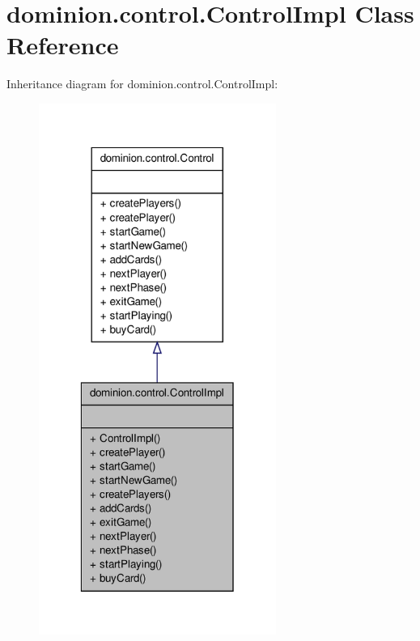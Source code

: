 \hypertarget{classdominion_1_1control_1_1ControlImpl}{\section{dominion.\-control.\-Control\-Impl \-Class \-Reference}
\label{classdominion_1_1control_1_1ControlImpl}
}


\-Inheritance diagram for dominion.\-control.\-Control\-Impl\-:
\nopagebreak
\begin{figure}[H]
\begin{center}
\leavevmode
\includegraphics[width=220pt]{classdominion_1_1control_1_1ControlImpl__inherit__graph}
\end{center}
\end{figure}


